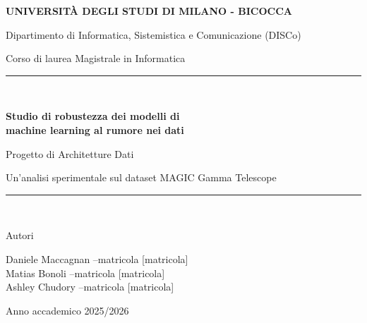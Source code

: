 \documentclass[12pt,a4paper]{article}
\begin{document}
\begin{titlepage}
	\centering
	\vspace*{0.6cm}
	{\Large\bfseries UNIVERSIT\`A DEGLI STUDI DI MILANO - BICOCCA\par}
	\vspace{0.4cm}
	{\large Dipartimento di Informatica, Sistemistica e Comunicazione (DISCo)\par}
	\vspace{0.2cm}
	{\large Corso di laurea Magistrale in Informatica\par}
	\vspace{1.2cm}

	\rule{\textwidth}{0.4pt}\\[0.4cm]
	{\LARGE\bfseries Studio di robustezza dei modelli di\\ machine learning al
	rumore nei dati\par}
	\vspace{0.35cm}
	{\large Progetto di Architetture Dati\par}
	\vspace{0.25cm}
	{\normalsize Un'analisi sperimentale sul dataset MAGIC Gamma Telescope\par}
	\rule{\textwidth}{0.4pt}\\[1.4cm]

	\begin{minipage}{0.9\textwidth}
		\centering
		{\large Autori\par}
		\vspace{0.3cm}
		{\large
			Daniele Maccagnan \quad--\quad matricola [matricola]\\[0.25cm]
			Matias Bonoli \quad--\quad matricola [matricola]\\[0.25cm]
			Ashley Chudory \quad--\quad matricola [matricola]\\
		}
	\end{minipage}

	\vfill
	{\large Anno accademico 2025/2026\par}
\end{titlepage}

\tableofcontents
\thispagestyle{plain}
\clearpage

\end{document}
